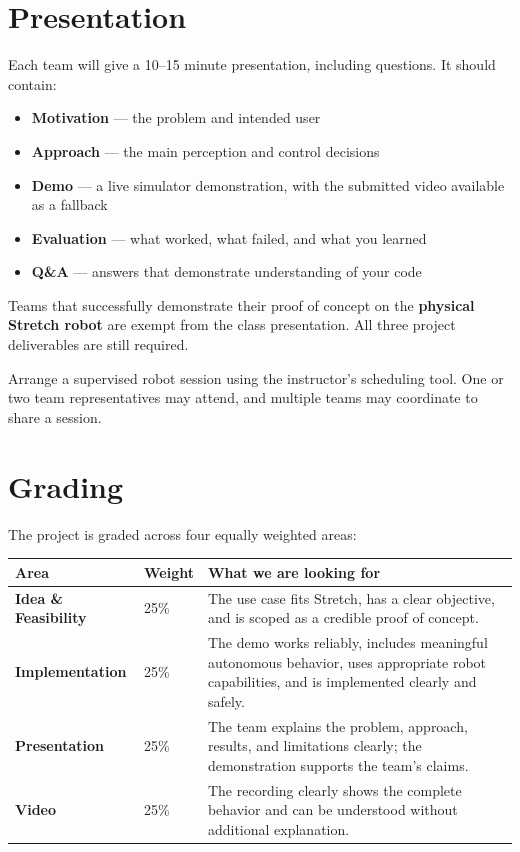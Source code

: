\documentclass[11pt,a4paper]{article}
\begin{document}
\section*{Presentation}

Each team will give a 10--15 minute presentation, including questions. It
should contain:

\begin{itemize}
    \item \textbf{Motivation} --- the problem and intended user
    \item \textbf{Approach} --- the main perception and control decisions
    \item \textbf{Demo} --- a live simulator demonstration, with the submitted
          video available as a fallback
    \item \textbf{Evaluation} --- what worked, what failed, and what you learned
    \item \textbf{Q\&A} --- answers that demonstrate understanding of your code
\end{itemize}

\begin{bonusbox}
Teams that successfully demonstrate their proof of concept on the
\textbf{physical Stretch robot} are exempt from the class presentation. All
three project deliverables are still required.

Arrange a supervised robot session using the instructor's scheduling tool.
One or two team representatives may attend, and multiple teams may coordinate
to share a session.
\end{bonusbox}

\section*{Grading}

The project is graded across four equally weighted areas:

\begin{center}
\begin{tabular}{llp{8.4cm}}
\toprule
\textbf{Area} & \textbf{Weight} & \textbf{What we are looking for} \\
\midrule
\textbf{Idea \& Feasibility} & 25\% &
    The use case fits Stretch, has a clear objective, and is scoped as a
    credible proof of concept. \\[6pt]
\textbf{Implementation} & 25\% &
    The demo works reliably, includes meaningful autonomous behavior, uses
    appropriate robot capabilities, and is implemented clearly and safely. \\[6pt]
\textbf{Presentation} & 25\% &
    The team explains the problem, approach, results, and limitations clearly;
    the demonstration supports the team's claims. \\[6pt]
\textbf{Video} & 25\% &
    The recording clearly shows the complete behavior and can be understood
    without additional explanation. \\
\bottomrule
\end{tabular}
\end{center}
\end{document}
